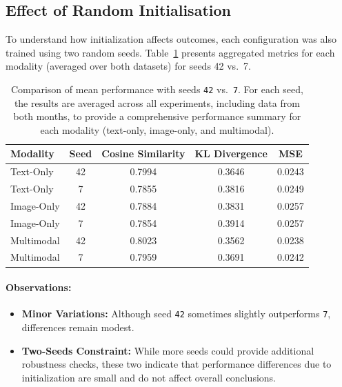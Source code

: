 \subsection{Effect of Random Initialisation}
\label{subsec:results_seeds}
To understand how initialization affects outcomes, each configuration was also trained using two random seeds. Table~\ref{tab:dataset_comparison_seed} presents aggregated metrics for each modality (averaged over both datasets) for seeds 42 vs.\ 7.

\begin{table}[ht]
    \centering
    \begin{tabular}{lcccc}
    \toprule
    \textbf{Modality} & \textbf{Seed} & \textbf{Cosine Similarity} & \textbf{KL Divergence} & \textbf{MSE} \\
    \midrule
    Text-Only & 42 & 0.7994 &  0.3646 & 0.0243 \\
    Text-Only & 7 & 0.7855 &  0.3816 & 0.0249 \\
    \midrule
    Image-Only & 42 & 0.7884 & 0.3831 & 0.0257 \\
    Image-Only & 7 & 0.7854 & 0.3914 & 0.0257 \\
    \midrule
    Multimodal & 42 & 0.8023 & 0.3562 & 0.0238 \\
    Multimodal & 7 & 0.7959 & 0.3691 & 0.0242 \\
    \bottomrule
    \end{tabular}%
    \caption{Comparison of mean performance with seeds \texttt{42} vs.\ \texttt{7}.
    For each seed, the results are averaged across all experiments, including data from both months, to provide a comprehensive performance summary for each modality (text-only, image-only, and multimodal).}
    \label{tab:dataset_comparison_seed}
\end{table}




\paragraph{Observations:}
\begin{itemize}
    \item \textbf{Minor Variations:} Although seed \texttt{42} sometimes slightly outperforms \texttt{7}, differences remain modest.
    \item \textbf{Two-Seeds Constraint:} While more seeds could provide additional robustness checks, these two indicate that performance differences due to initialization are small and do not affect overall conclusions.
\end{itemize}

